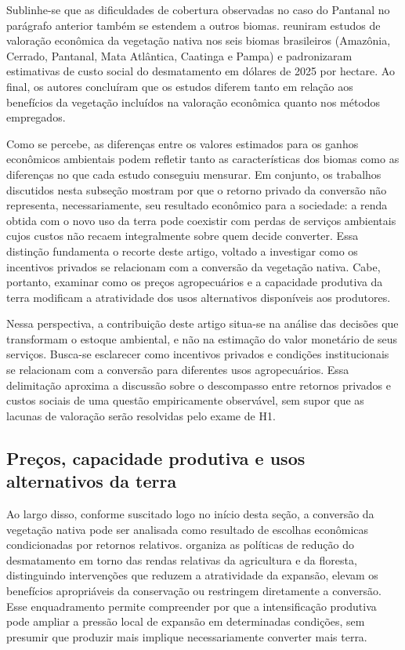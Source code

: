 Sublinhe-se que as dificuldades de cobertura observadas no caso do Pantanal no parágrafo anterior também se estendem a outros biomas.  reuniram estudos de valoração econômica da vegetação nativa nos seis biomas brasileiros (Amazônia, Cerrado, Pantanal, Mata Atlântica, Caatinga e Pampa) e padronizaram estimativas de custo social do desmatamento em dólares de 2025 por hectare. Ao final, os autores concluíram que os estudos diferem tanto em relação aos benefícios da vegetação incluídos na valoração econômica quanto nos métodos empregados. 

Como se percebe, as diferenças entre os valores estimados para os ganhos econômicos ambientais podem refletir tanto as características dos biomas como as diferenças no que cada estudo conseguiu mensurar. Em conjunto, os trabalhos discutidos nesta subseção mostram por que o retorno privado da conversão não representa, necessariamente, seu resultado econômico para a sociedade: a renda obtida com o novo uso da terra pode coexistir com perdas de serviços ambientais cujos custos não recaem integralmente sobre quem decide converter. Essa distinção fundamenta o recorte deste artigo, voltado a investigar como os incentivos privados se relacionam com a conversão da vegetação nativa. Cabe, portanto, examinar como os preços agropecuários e a capacidade produtiva da terra modificam a atratividade dos usos alternativos disponíveis aos produtores.

Nessa perspectiva, a contribuição deste artigo situa-se na análise das decisões que transformam o estoque ambiental, e não na estimação do valor monetário de seus serviços. Busca-se esclarecer como incentivos privados e condições institucionais se relacionam com a conversão para diferentes usos agropecuários. Essa delimitação aproxima a discussão sobre o descompasso entre retornos privados e custos sociais de uma questão empiricamente observável, sem supor que as lacunas de valoração serão resolvidas pelo exame de H1.

\subsection{Preços, capacidade produtiva e usos alternativos da terra}

Ao largo disso, conforme suscitado logo no início desta seção, a conversão da vegetação nativa pode ser analisada como resultado de escolhas econômicas condicionadas por retornos relativos.  organiza as políticas de redução do desmatamento em torno das rendas relativas da agricultura e da floresta, distinguindo intervenções que reduzem a atratividade da expansão, elevam os benefícios apropriáveis da conservação ou restringem diretamente a conversão. Esse enquadramento permite compreender por que a intensificação produtiva pode ampliar a pressão local de expansão em determinadas condições, sem presumir que produzir mais implique necessariamente converter mais terra.

